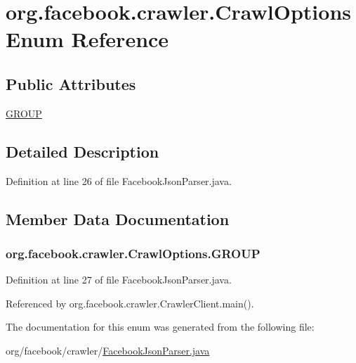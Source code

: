 \hypertarget{enumorg_1_1facebook_1_1crawler_1_1_crawl_options}{\section{org.\-facebook.\-crawler.\-Crawl\-Options Enum Reference}
\label{enumorg_1_1facebook_1_1crawler_1_1_crawl_options}
}
\subsection*{Public Attributes}
\begin{DoxyCompactItemize}
\item 
\hyperlink{enumorg_1_1facebook_1_1crawler_1_1_crawl_options_a67f8977a991ae7cc9bf756a8e33f19aa}{G\-R\-O\-U\-P}
\end{DoxyCompactItemize}


\subsection{Detailed Description}


Definition at line 26 of file Facebook\-Json\-Parser.\-java.



\subsection{Member Data Documentation}
\hypertarget{enumorg_1_1facebook_1_1crawler_1_1_crawl_options_a67f8977a991ae7cc9bf756a8e33f19aa}{
\subsubsection[{G\-R\-O\-U\-P}]{\setlength{\rightskip}{0pt plus 5cm}org.\-facebook.\-crawler.\-Crawl\-Options.\-G\-R\-O\-U\-P}}\label{enumorg_1_1facebook_1_1crawler_1_1_crawl_options_a67f8977a991ae7cc9bf756a8e33f19aa}


Definition at line 27 of file Facebook\-Json\-Parser.\-java.



Referenced by org.\-facebook.\-crawler.\-Crawler\-Client.\-main().



The documentation for this enum was generated from the following file\-:\begin{DoxyCompactItemize}
\item 
org/facebook/crawler/\hyperlink{_facebook_json_parser_8java}{Facebook\-Json\-Parser.\-java}\end{DoxyCompactItemize}
